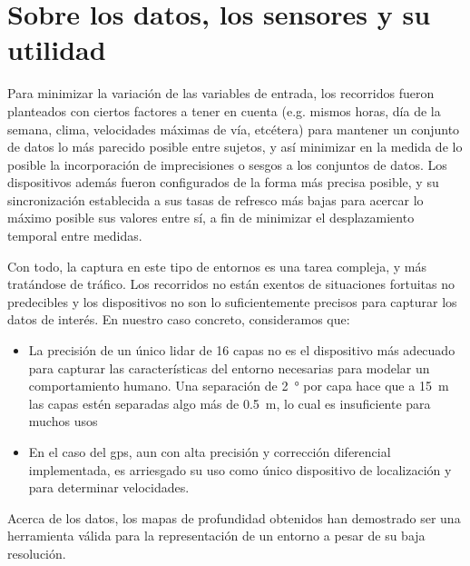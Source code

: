 \section{Sobre los datos, los sensores y su utilidad}

Para minimizar la variación de las variables de entrada, los recorridos fueron planteados con ciertos factores a tener en cuenta (e.g. mismos horas, día de la semana, clima, velocidades máximas de vía, etcétera) para mantener un conjunto de datos lo más parecido posible entre sujetos, y así minimizar en la medida de lo posible la incorporación de imprecisiones o sesgos a los conjuntos de datos. Los dispositivos además fueron configurados de la forma más precisa posible, y su sincronización establecida a sus tasas de refresco más bajas para acercar lo máximo posible sus valores entre sí, a fin de minimizar el desplazamiento temporal entre medidas.

Con todo, la captura en este tipo de entornos es una tarea compleja, y más tratándose de tráfico. Los recorridos no están exentos de situaciones fortuitas no predecibles y los dispositivos no son lo suficientemente precisos para capturar los datos de interés. En nuestro caso concreto, consideramos que:

\begin{itemize}
	\item La precisión de un único \acrshort{lidar} de 16 capas no es el dispositivo más adecuado para capturar las características del entorno necesarias para modelar un comportamiento humano. Una separación de \SI{2}{\degree} por capa hace que a \SI{15}{\meter} las capas estén separadas algo más de \SI{0.5}{\meter}, lo cual es insuficiente para muchos usos
	\item En el caso del \ac{gps}, aun con alta precisión y corrección diferencial implementada, es arriesgado su uso como único dispositivo de localización y para determinar velocidades.
\end{itemize}

Acerca de los datos, los mapas de profundidad obtenidos han demostrado ser una herramienta válida para la representación de un entorno a pesar de su baja resolución.

